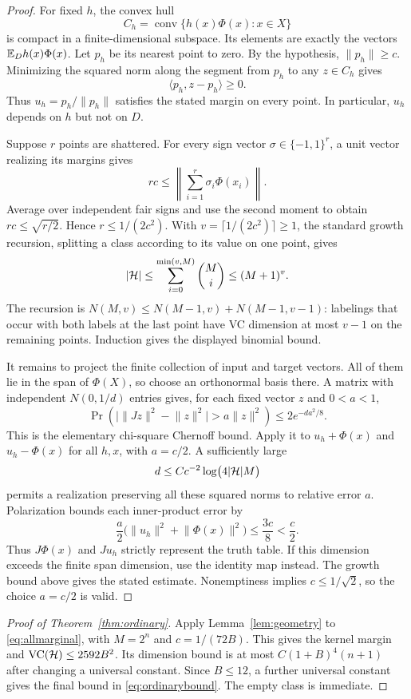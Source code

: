 \documentclass[11pt,letterpaper,pmlr,twoside]{jmlr}
\newcommand{\ip}[2]{\langle #1,#2\rangle}\newcommand{\norm}[1]{\lVert #1\rVert}
\begin{document}
\begin{proof}
For fixed $h$, the convex hull
\[
 C_h=\operatorname{conv}\{h(x)\Phi(x):x\in X\}
\]
is compact in a finite-dimensional subspace. Its elements are exactly the vectors $\mathbb E_Dh(x)\Phi(x)$. Let $p_h$ be its nearest point to zero. By the hypothesis, $\norm{p_h}\ge c$. Minimizing the squared norm along the segment from $p_h$ to any $z\in C_h$ gives
\[
 \ip{p_h}{z-p_h}\ge0.
\]
Thus $u_h=p_h/\norm{p_h}$ satisfies the stated margin on every point. In particular, $u_h$ depends on $h$ but not on $D$.

Suppose $r$ points are shattered. For every sign vector $\sigma\in\{-1,1\}^r$, a unit vector realizing its margins gives
\[
 rc\le\left\|\sum_{i=1}^r\sigma_i\Phi(x_i)\right\|.
\]
Average over independent fair signs and use the second moment to obtain $rc\le\sqrt{r/2}$. Hence $r\le1/(2c^2)$. With $v=\lceil1/(2c^2)\rceil\ge1$, the standard growth recursion, splitting a class according to its value on one point, gives
\[
 |\mathcal H|\le\sum_{i=0}^{\min(v,M)}\binom Mi\le(M+1)^v.
\]
The recursion is $N(M,v)\le N(M-1,v)+N(M-1,v-1)$: labelings that occur with both labels at the last point have VC dimension at most $v-1$ on the remaining points. Induction gives the displayed binomial bound.

It remains to project the finite collection of input and target vectors. All of them lie in the span of $\Phi(X)$, so choose an orthonormal basis there. A matrix with independent $N(0,1/d)$ entries gives, for each fixed vector $z$ and $0<a<1$,
\[
 \Pr\left(\big|\norm{Jz}^2-\norm z^2\big|>a\norm z^2\right)
 \le2e^{-da^2/8}.
\]
This is the elementary chi-square Chernoff bound. Apply it to $u_h+\Phi(x)$ and $u_h-\Phi(x)$ for all $h,x$, with $a=c/2$. A sufficiently large
\[
 d\le C c^{-2}\log\bigl(4|\mathcal H|M\bigr)
\]
permits a realization preserving all these squared norms to relative error $a$. Polarization bounds each inner-product error by
\[
 \frac a2\bigl(\norm{u_h}^2+\norm{\Phi(x)}^2\bigr)
 \le\frac{3c}{8}<\frac c2.
\]
Thus $J\Phi(x)$ and $Ju_h$ strictly represent the truth table. If this dimension exceeds the finite span dimension, use the identity map instead. The growth bound above gives the stated estimate. Nonemptiness implies $c\le1/\sqrt2$, so the choice $a=c/2$ is valid.
\end{proof}

\begin{proof}[Proof of Theorem~\ref{thm:ordinary}]
Apply Lemma~\ref{lem:geometry} to \eqref{eq:allmarginal}, with $M=2^n$ and $c=1/(72B)$. This gives the kernel margin and $\operatorname{VC}(\mathcal H)\le2592B^2$. Its dimension bound is at most $C(1+B)^4(n+1)$ after changing a universal constant. Since $B\le12$, a further universal constant gives the final bound in \eqref{eq:ordinarybound}. The empty class is immediate.
\end{proof}
\end{document}
